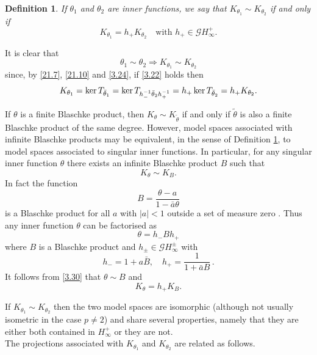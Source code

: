\documentclass[11pt]{article}
\def\ker{\mathop{\rm ker}\nolimits}
\newtheorem{defn}[thm]{Definition}
\numberwithin{equation}{section}
\begin{document}
\begin{defn}\label{def:3.11}
If $\theta_1$ and $\theta_2$ are inner functions, we say that $K_{\theta_1}\sim K_{\theta_2}$ if and only if
\begin{equation}\label{3.25}
K_{\theta_1}=h_+K_{\theta_2} \quad \text{with } h_+ \in \mathcal{G}H_\infty^+.
\end{equation}
\end{defn}

It is clear that
\begin{equation}\label{3.26}
\theta_1 \sim \theta_2 \Rightarrow K_{\theta_1}\sim K_{\theta_2}
\end{equation}
since, by \eqref{21.7}, \eqref{21.10} and \eqref{3.24}, if \eqref{3.22} holds then
\[
 K_{\theta_1}=\ker T_{\bar{\theta}_1}=\ker T_{h_-^{-1}\bar{\theta}_2h_+^{-1}}=h_+\ker T_{\bar{\theta}_2}=h_+K_{\theta_2}.
\]

If $\theta$ is a finite Blaschke product, then $K_\theta \sim K_{\tilde \theta}$ if and only if $\tilde \theta$ is also a finite Blaschke product of the same degree. However, model spaces associated with infinite Blaschke products may be equivalent, in the sense of Definition \ref {def:3.11}, to model spaces associated to singular inner functions. In particular, for any singular inner function $\theta$ there exists an infinite Blaschke product $B$ such that
\begin{equation}\label{3.281}
K_\theta \sim K_B.
\end{equation}
In fact the function
\begin{equation}\label{3.29}
B=\frac{\theta-a}{1-\bar{a}\theta}
\end{equation}
is a Blaschke product for all $a$ with $|a|<1$ outside a set of measure zero \cite{duren, Frostman}. Thus any inner function $\theta$ can be factorised as
\begin{equation}\label{3.30}
\theta=h_-Bh_+
\end{equation}
where $B$ is a Blaschke product and $h_\pm \in \mathcal{G}H_\infty^\pm$ with
 \begin{equation}\label{3.31}
h_-=1+a\bar{B}, \quad h_+=\frac{1}{1+\bar{a}B}\,.
\end{equation}
It follows from \eqref{3.30} that $\theta \sim B$ and 
 \begin{equation}\label{3.32}
K_\theta=h_+K_B.
\end{equation}


If $K_{\theta_1}\sim K_{\theta_2}$ then the two model spaces are isomorphic (although not usually isometric in the case $p \ne 2$) and share several properties, namely that they are either both contained in $H_\infty^+$ or they are not.\\
The projections associated with $K_{\theta_1}$ and $K_{\theta_2}$ are related as follows.
\end{document}
